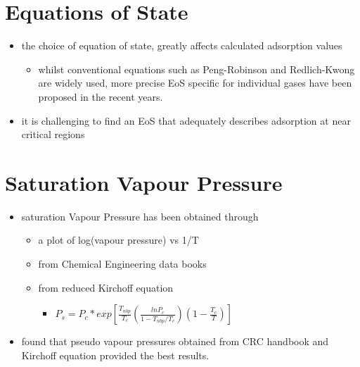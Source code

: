 \documentclass[11pt]{article}
\begin{document}
\section{Equations of State}
\label{sec:orgfba7b83}
\begin{itemize}
\item the choice of equation of state, greatly affects calculated adsorption values
\begin{itemize}
\item whilst conventional equations such as Peng-Robinson and Redlich-Kwong are widely used, more precise EoS specific for individual gases have been proposed in the recent years.
\end{itemize}
\item it is challenging to find an EoS that adequately describes adsorption at near critical regions \cite{Siemons2007}
\end{itemize}

\section{Saturation Vapour Pressure}
\label{sec:orgf527146}
\begin{itemize}
\item saturation Vapour Pressure has been obtained through 
\begin{itemize}
\item a plot of log(vapour pressure) vs 1/T \cite{Clarkson1997}
\item from Chemical Engineering data books \cite{Lide2003}
\item from reduced Kirchoff equation \cite{Kapoor1989}
\begin{itemize}
\item \(P _s = P _c * exp[ \frac{T _{nbp}}{T _c} (\frac{ln P _c}{1 - T _{nbp}/T _c})(1 - \frac{T _c}{T}) ]\)
\end{itemize}
\end{itemize}
\item \cite{Clarkson1997} found that pseudo vapour pressures obtained from CRC handbook and Kirchoff equation provided the best results.
\end{itemize}
\end{document}
